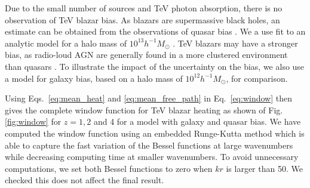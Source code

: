 \documentclass[twocolumns]{emulateapj}
\begin{document}
{{Due to the small number of sources and TeV photon absorption, there is no observation of  TeV blazar bias.  As blazars are supermassive black holes, an estimate can be obtained from the observations of quasar bias \citep{2005MNRAS.356..415C,2007ApJ...658...85M,2007AJ....133.2222S}. We a use fit to an analytic model for a halo mass of $10^{13}h^{-1}M_{\odot}$ \citet{2008ApJ...678..627B}.  TeV blazars may have a stronger bias, as radio-loud AGN are generally found in a more clustered environment than quasars \citep{2009MNRAS.393..377M,2012MNRAS.421.3060S}. To illustrate the impact of the uncertainty on the bias, we also use a model for galaxy bias, based on a  halo mass of $10^{12}h^{-1} M_{\odot}$,  for comparison. }





Using Eqs.~\ref{eq:mean_heat} and \ref{eq:mean_free_path} in Eq.~\ref{eq:window} then gives the complete window function for TeV blazar heating as shown of Fig. \ref{fig:window} for $z=1,2$ and 4 for a model with galaxy and quasar bias. We have computed the window function using an embedded Runge-Kutta method which is able to capture the fast variation of the Bessel functions at large wavenumbers while decreasing computing time at smaller wavenumbers. To avoid unnecessary computations, we set both Bessel functions to zero when $kr$ is larger than 50. We checked this does not affect the final result.

}
\end{document}
